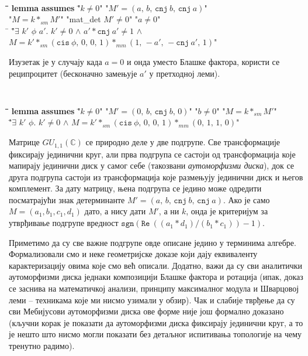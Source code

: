{\tt
  \begin{tabbing}
    \hspace{5mm}\=\hspace{5mm}\=\hspace{5mm}\=\hspace{5mm}\=\hspace{5mm}\=\kill
{\bf lemma} \={\bf assumes} \="$k \neq 0$" "$M' = (a,\,b,\,\mathtt{cnj}\ b,\,\mathtt{cnj}\ a)$"\\
\>\>"$M = k *_{sm} M'$" "mat\_det $M' \neq 0$" "$a \neq 0$"\\
\hspace{5mm}\=\kill
{} "\=$\exists$ $k'$ $\phi$ $a'$. $k' \neq 0$ $\wedge$ $a' * \mathtt{cnj}\ a' \neq 1$ $\wedge$\\
\>\> $M = k' *_{sm} (\mathtt{cis}\ \phi,\,0,\,0,\,1) *_{mm} (1,\,-a',\,-\mathtt{cnj}\ a',\,1)$"
  \end{tabbing}
}
\noindent Изузетак је у случају када $a=0$ и онда уместо Блашке
фактора, користи се реципроцитет (бесконачно замењује $a'$ у
претходној леми).  {\tt
  \begin{tabbing}
    \hspace{5mm}\=\hspace{5mm}\=\hspace{5mm}\=\hspace{5mm}\=\hspace{5mm}\=\kill
{\bf lemma} \={\bf assumes} \="$k \neq 0$" "$M' = (0,\,b,\,\mathtt{cnj}\ b,\,0)$" "$b \neq 0$" "$M = k *_{sm} M'$" \\
 "\=$\exists$ $k'$ $\phi$. $k' \neq 0$ $\wedge$ $M = k' *_{sm} (\mathtt{cis}\ \phi,\,0,\,0,\,1) *_{mm} (0,\,1,\,1,\,0)$"
  \end{tabbing}
}

Матрице $GU_{1,1}(\mathbb{C})$ се природно деле у две подгрупе.  Све
трансформације фиксирају јединични круг, али прва подгрупа се састоји
од трансформација које мапирају јединични диск у самог себе (такозвани
\emph{аутоморфизми диска}), док се друга подгрупа састоји из
трансформација које размењују јединични диск и његов комплемент. За
дату матрицу, њена подгрупа се једино може одредити посматрајући знак
детерминанте $M' = (a,\,b,\,\mathtt{cnj}\ b,\,\mathtt{cnj}\ a)$. Ако
је само $M = (a_1, b_1, c_1, d_1)$ дато, а нису дати $M'$, а ни $k$,
онда је критеријум за утврђивање подгрупе вредност $\mathtt{sgn}
(\mathtt{Re}\ ((a_1*d_1)/(b_1*c_1)) - 1)$.

Приметимо да су све важне подгрупе овде описане једино у терминима
алгебре. Формализовали смо и неке геометријске доказе који дају
еквиваленту карактеризацију овима које смо већ описали. Додатно, важи
да су сви аналитички аутоморфизми диска једнаки композицији Блашке
фактора и ротација (ипак, доказ се заснива на математичкој анализи,
принципу максималног модула и Шварцовој леми -- техникама које ми
нисмо узимали у обзир). Чак и слабије тврђење да су сви Мебијусови
аутоморфизми диска ове форме није још формално доказано (кључни корак
је показати да аутоморфизми диска фиксирају јединични круг, а то је
нешто што нисмо могли показати без детаљног испитивања топологије на
чему тренутно радимо).


